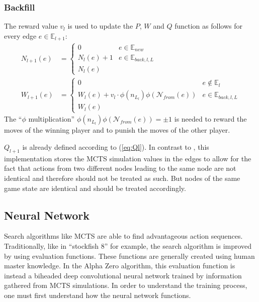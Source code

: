 \documentclass[12pt]{article}
\newcommand{\quckeq}[1]{(\ref{#1})}
\newcommand{\InBreadcrums}[0]{e \in \mathbb E_{back,l,L}}
\begin{document}
\subsubsection{Backfill}
\label{sec:Methods:MCTS:Backfill}
The reward value \(v_l\) is used to update the \(P\), \(W\) and \(Q\) function as follows for every edge \(e\in\mathbb E_{l+1}\):
\begin{align}
N_{l+1}(e) &= \left\{\begin{matrix}
0 & e \in\mathbb E_{new}\\
N_l(e)+1 & \InBreadcrums\\
N_l(e)
\end{matrix}\right.\\
%
W_{l+1}(e) &= \left\{\begin{matrix}
0 & e \not\in\mathbb E_l\\
W_l(e)+v_l\cdot\phi(n_{L_l})\phi(\mathcal N_{from}(e)) & \InBreadcrums\\
W_l(e)
\end{matrix}\right.
\end{align}
The ``\(\phi\) multiplication'' \(\phi(n_{L_l})\phi(\mathcal N_{from}(e)) = \pm 1\) is needed to reward the moves of the winning player and  to punish the moves of the other player.


\noindent\(Q_{l+1}\) is already defined according to \quckeq{eq:Ql}. In contrast to \cite{silver2018general}, this implementation stores the MCTS simulation values in the edges to allow for the fact that actions from two different nodes leading to the same node are not identical and therefore should not be treated as such. But nodes of the same game state are identical and should be treated accordingly.\newpage
\subsection{Neural Network}
Search algorithms like MCTS are able to find advantageous action sequences. Traditionally, like in ``stockfish 8'' for example, the search algorithm is improved by using evaluation functions. These functions are generally created using human master knowledge. In the Alpha Zero algorithm, this evaluation function is instead a biheaded deep convolutional neural network trained by information gathered from MCTS simulations. In order to understand the training process, one must first understand how the neural network functions.
\label{NN}
\end{document}
